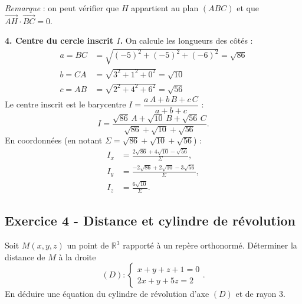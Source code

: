 \documentclass[12pt,a4paper]{article}
\begin{document}
\begin{boitecorrige}
\textit{Remarque} : on peut vérifier que $H$ appartient au plan $(ABC)$ et que
$\overrightarrow{AH}\cdot\overrightarrow{BC}=0$.

\textbf{4. Centre du cercle inscrit $I$.}
On calcule les longueurs des côtés :
\begin{align*}
  a = BC &= \sqrt{(-5)^2+(-5)^2+(-6)^2} = \sqrt{86}\\
  b = CA &= \sqrt{3^2+1^2+0^2} = \sqrt{10}\\
  c = AB &= \sqrt{2^2+4^2+6^2} = \sqrt{56}
\end{align*}
Le centre inscrit est le barycentre $I = \dfrac{a\,A + b\,B + c\,C}{a+b+c}$ :
\[
  I = \frac{\sqrt{86}\,A + \sqrt{10}\,B + \sqrt{56}\,C}{\sqrt{86}+\sqrt{10}+\sqrt{56}}.
\]
En coordonnées (en notant $\Sigma = \sqrt{86}+\sqrt{10}+\sqrt{56}$) :
\begin{align*}
  I_x &= \frac{2\sqrt{86}+4\sqrt{10}-\sqrt{56}}{\Sigma}, \\
  I_y &= \frac{-2\sqrt{86}+2\sqrt{10}-3\sqrt{56}}{\Sigma}, \\
  I_z &= \frac{6\sqrt{10}}{\Sigma}.
\end{align*}
\end{boitecorrige}

\subsection*{Exercice 4 - Distance et cylindre de révolution \niveau{\moyen}}

\begin{boiteexercice}
Soit $M(x,y,z)$ un point de $\mathbb{R}^3$ rapporté à un repère orthonormé. Déterminer la distance de
$M$ à la droite
\[
  (D) : \begin{cases} x+y+z+1=0 \\ 2x+y+5z=2 \end{cases}.
\]
En déduire une équation du cylindre de révolution d'axe $(D)$ et de rayon $3$.
\end{boiteexercice}
\end{document}
